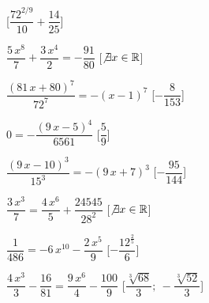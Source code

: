 \begin{esercizio}
\begin{enumeratea}
\hfill [\({\dfrac{7 {2}^{2/9}}{10}}+{\dfrac{14}{25}}\)]
\item \({\dfrac{5\,{x}^{8}}{7}}+{\dfrac{3\,{x}^{4}}{2}}=-{\dfrac
{91}{80}}\) 
\hfill [\(\not\exists x \in \mathbb{R}\)]
\item \({\dfrac{ \left( 81\,x+80 \right) ^{7}}{72^7}}=- \left( x-1 
\right) ^{7}\) 
\hfill [\(-{\dfrac{8}{153}}\)]
\item \(0=-{\dfrac{ \left( 9\,x-5 \right) ^{4}}{6561}}\) 
\hfill [\({\dfrac{5}{9}}\)]
\item \({\dfrac{ \left( 9\,x-10 \right) ^{3}}{15^3}}=- \left( 9\,x+7 
\right) ^{3}\) 
\hfill [\(-{\dfrac{95}{144}}\)]
\item \({\dfrac{3\,{x}^{3}}{7}}={\dfrac{4\,{x}^{6}}{5}}+{\dfrac
{24545}{28^2}}\) 
\hfill [\(\not\exists x \in \mathbb{R}\)]
\item \({\dfrac{1}{486}}=-6\,{x}^{10}-{\dfrac{2\,{x}^{5}}{9}}\) 
\hfill [\(-{\dfrac{{12}^{{\frac{2}{5}}}}{6}}\)]
\item \({\dfrac{4\,{x}^{3}}{3}}-{\dfrac{16}{81}}={\dfrac
{9\,{x}^{6}}{4}}-{\dfrac{100}{9}}\) 
\hfill [\({\dfrac{\sqrt [3]{68}}{3}};~-{\dfrac{\sqrt[3]{52}}{3}}\)]
\end{enumeratea}
\end{esercizio}

